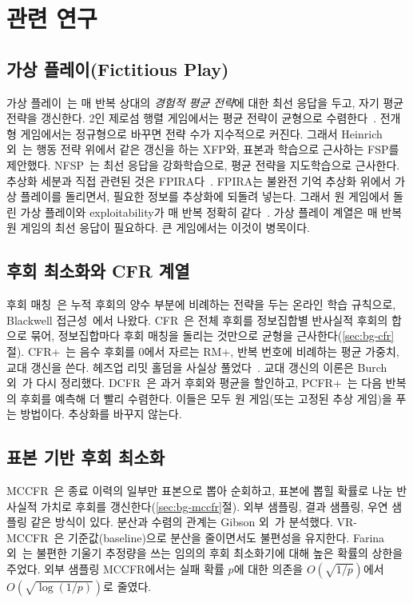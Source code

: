 \section{관련 연구}\label{sec:related}

\subsection{가상 플레이(Fictitious Play)}
가상 플레이~\citep{brown1951iterative}는 매 반복 상대의 \emph{경험적 평균 전략}에 대한 최선 응답을 두고, 자기 평균 전략을 갱신한다.
2인 제로섬 행렬 게임에서는 평균 전략이 균형으로 수렴한다~\citep{robinson1951iterative}.
전개형 게임에서는 정규형으로 바꾸면 전략 수가 지수적으로 커진다. 그래서 Heinrich 외~\citep{heinrich2015fictitious}는 행동 전략 위에서 같은 갱신을 하는 XFP와, 표본과 학습으로 근사하는 FSP를 제안했다.
NFSP~\citep{heinrich2016deep}는 최선 응답을 강화학습으로, 평균 전략을 지도학습으로 근사한다.
추상화 세분과 직접 관련된 것은 FPIRA다~\citep{cermak2017algorithm,cermak2020automated}.
FPIRA는 불완전 기억 추상화 위에서 가상 플레이를 돌리면서, 필요한 정보를 추상화에 되돌려 넣는다. 그래서 원 게임에서 돌린 가상 플레이와 exploitability가 매 반복 정확히 같다~\citep[정리 1]{cermak2020automated}.
가상 플레이 계열은 매 반복 원 게임의 최선 응답이 필요하다. 큰 게임에서는 이것이 병목이다.

\subsection{후회 최소화와 CFR 계열}
후회 매칭~\citep{hart2000simple}은 누적 후회의 양수 부분에 비례하는 전략을 두는 온라인 학습 규칙으로, Blackwell 접근성~\citep{blackwell1956analog}에서 나왔다.
CFR~\citep{zinkevich2007regret}은 전체 후회를 정보집합별 반사실적 후회의 합으로 묶어, 정보집합마다 후회 매칭을 돌리는 것만으로 균형을 근사한다(\ref{sec:bg-cfr}절).
CFR+~\citep{tammelin2014solving,tammelin2015solving}는 음수 후회를 0에서 자르는 RM+, 반복 번호에 비례하는 평균 가중치, 교대 갱신을 쓴다. 헤즈업 리밋 홀덤을 사실상 풀었다~\citep{bowling2015heads}.
교대 갱신의 이론은 Burch 외~\citep{burch2019revisiting}가 다시 정리했다.
DCFR~\citep{brown2019solving}은 과거 후회와 평균을 할인하고, PCFR+~\citep{farina2021faster}는 다음 반복의 후회를 예측해 더 빨리 수렴한다.
이들은 모두 원 게임(또는 고정된 추상 게임)을 푸는 방법이다. 추상화를 바꾸지 않는다.

\subsection{표본 기반 후회 최소화}
MCCFR~\citep{lanctot2009monte}은 종료 이력의 일부만 표본으로 뽑아 순회하고, 표본에 뽑힐 확률로 나눈 반사실적 가치로 후회를 갱신한다(\ref{sec:bg-mccfr}절).
외부 샘플링, 결과 샘플링, 우연 샘플링 같은 방식이 있다. 분산과 수렴의 관계는 Gibson 외~\citep{gibson2012generalized}가 분석했다.
VR-MCCFR~\citep{schmid2019variance}은 기준값(baseline)으로 분산을 줄이면서도 불편성을 유지한다.
Farina 외~\citep{farina2020stochastic}는 불편한 기울기 추정량을 쓰는 임의의 후회 최소화기에 대해 높은 확률의 상한을 주었다. 외부 샘플링 MCCFR에서는 실패 확률 $p$에 대한 의존을 $O(\sqrt{1/p})$에서 $O(\sqrt{\log(1/p)})$로 줄였다.

